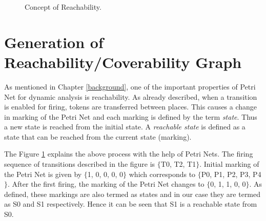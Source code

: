 \begin{figure}[htb!]
	\caption{Concept of Reachability.}
\label{fig:rgconcept}
\end{figure}

\section{Generation of Reachability/Coverability Graph}
As mentioned in Chapter \ref{background}, one of the important properties of Petri Net for dynamic analysis is reachability. As already described, when a transition is enabled for firing, tokens are transferred between places. This causes a change in marking of the Petri Net and each marking is defined by the term \textit{state}. Thus a new state is reached from the initial state. A \textit{reachable state} is defined as a state that can be reached from the current state (marking).

The Figure \ref{fig:rgconcept} explains the above process with the help of Petri Nets. The firing sequence of transitions described in the figure is $ \lbrace $T0, T2, T1$ \rbrace $. Initial marking of the Petri Net is given by $ \lbrace $1, 0, 0, 0, 0$ \rbrace $ which corresponds to $ \lbrace $P0, P1, P2, P3, P4$ \rbrace $. After the first firing, the marking of the Petri Net changes to $ \lbrace $0, 1, 1, 0, 0$ \rbrace $. As defined, these markings are also termed as states and in our case they are termed as S0 and S1 respectively. Hence it can be seen that S1 is a reachable state from S0.

